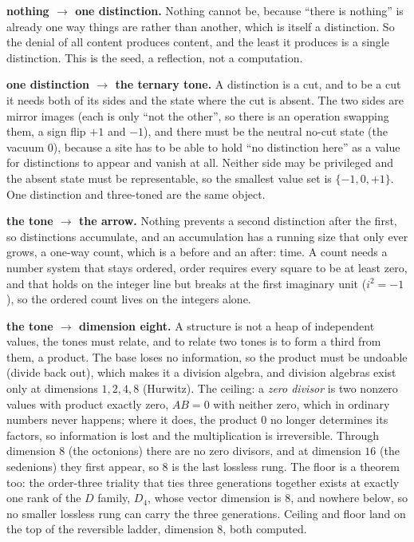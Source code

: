 \documentclass{article}
\begin{document}
\textbf{nothing $\to$ one distinction.} Nothing cannot be, because ``there is nothing'' is
already one way things are rather than another, which is itself a distinction. So the denial of
all content produces content, and the least it produces is a single distinction. This is the
seed, a reflection, not a computation.

\textbf{one distinction $\to$ the ternary tone.} A distinction is a cut, and to be a cut it
needs both of its sides and the state where the cut is absent. The two sides are mirror images
(each is only ``not the other'', so there is an operation swapping them, a sign flip $+1$ and
$-1$), and there must be the neutral no-cut state (the vacuum $0$), because a site has to be able
to hold ``no distinction here'' as a value for distinctions to appear and vanish at all. Neither
side may be privileged and the absent state must be representable, so the smallest value set is
$\{-1,0,+1\}$. One distinction and three-toned are the same object.

\textbf{the tone $\to$ the arrow.} Nothing prevents a second distinction after the first, so
distinctions accumulate, and an accumulation has a running size that only ever grows, a one-way
count, which is a before and an after: time. A count needs a number system that stays ordered,
order requires every square to be at least zero, and that holds on the integer line but breaks
at the first imaginary unit ($i^2 = -1$), so the ordered count lives on the integers alone.

\textbf{the tone $\to$ dimension eight.} A structure is not a heap of independent values, the
tones must relate, and to relate two tones is to form a third from them, a product. The base
loses no information, so the product must be undoable (divide back out), which makes it a
division algebra, and division algebras exist only at dimensions $1,2,4,8$ (Hurwitz). The ceiling:
a \emph{zero divisor} is two nonzero values with product exactly zero, $A B = 0$ with neither
zero, which in ordinary numbers never happens; where it does, the product $0$ no longer determines
its factors, so information is lost and the multiplication is irreversible. Through dimension $8$
(the octonions) there are no zero divisors, and at dimension $16$ (the sedenions) they first
appear, so $8$ is the last lossless rung. The floor is a theorem too: the order-three triality
that ties three generations together exists at exactly one rank of the $D$ family, $D_4$, whose
vector dimension is $8$, and nowhere below, so no smaller lossless rung can carry the three
generations. Ceiling and floor land on the top of the reversible ladder, dimension $8$, both
computed.
\end{document}
